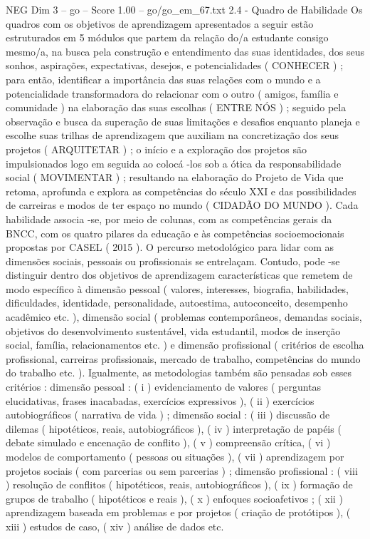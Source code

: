 \begin{textsample}{NEG Dim 3 – go – Score 1.00 – go/go\_em\_67.txt}  \label{ex:f3_neg_247}
2.4 - Quadro de Habilidade Os quadros com os objetivos de aprendizagem apresentados a seguir estão estruturados em 5 módulos que partem da relação do/a estudante consigo mesmo/a, na busca pela construção e entendimento das suas identidades, dos seus sonhos, aspirações, expectativas, desejos, e potencialidades ( CONHECER ) ; para então, identificar a importância das suas relações com o mundo e a potencialidade transformadora do relacionar com o outro ( amigos, família e comunidade ) na elaboração das suas escolhas ( ENTRE NÓS ) ; seguido pela observação e busca da superação de suas limitações e desafios enquanto planeja e escolhe suas trilhas de aprendizagem que auxiliam na concretização dos seus projetos ( ARQUITETAR ) ; o início e a exploração dos projetos são impulsionados logo em seguida ao colocá -los sob a ótica da responsabilidade social ( MOVIMENTAR ) ; resultando na elaboração do Projeto de Vida que retoma, aprofunda e explora as competências do século XXI e das possibilidades de carreiras e modos de ter espaço no mundo ( CIDADÃO DO MUNDO ).
Cada habilidade associa -se, por meio de colunas, com as competências gerais da BNCC, com os quatro pilares da educação e às competências socioemocionais propostas por CASEL ( 2015 ).
O percurso metodológico para lidar com as dimensões sociais, pessoais ou profissionais se entrelaçam.
Contudo, pode -se distinguir dentro dos objetivos de aprendizagem características que remetem de modo específico à dimensão pessoal ( valores, interesses, biografia, habilidades, dificuldades, identidade, personalidade, autoestima, autoconceito, desempenho acadêmico etc. ), dimensão social ( problemas contemporâneos, demandas sociais, objetivos do desenvolvimento sustentável, vida estudantil, modos de inserção social, família, relacionamentos etc. ) e dimensão profissional ( critérios de escolha profissional, carreiras profissionais, mercado de trabalho, competências do mundo do trabalho etc. ).
Igualmente, as metodologias também são pensadas sob esses critérios : dimensão pessoal : ( i ) evidenciamento de valores ( perguntas elucidativas, frases inacabadas, exercícios expressivos ), ( ii ) exercícios autobiográficos ( narrativa de vida ) ; dimensão social : ( iii ) discussão de dilemas ( hipotéticos, reais, autobiográficos ), ( iv ) interpretação de papéis ( debate simulado e encenação de conflito ), ( v ) compreensão crítica, ( vi ) modelos de comportamento ( pessoas ou situações ), ( vii ) aprendizagem por projetos sociais ( com parcerias ou sem parcerias ) ; dimensão profissional : ( viii ) resolução de conflitos ( hipotéticos, reais, autobiográficos ), ( ix ) formação de grupos de trabalho ( hipotéticos e reais ), ( x ) enfoques socioafetivos ; ( xii ) aprendizagem baseada em problemas e por projetos ( criação de protótipos ), ( xiii ) estudos de caso, ( xiv ) análise de dados etc.

\end{textsample}
